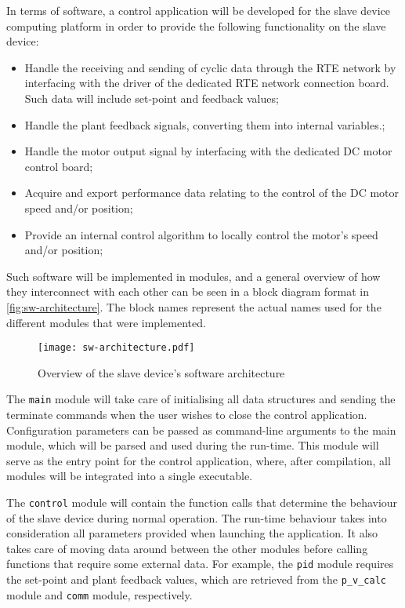 In terms of software, a control application will be developed for the slave device computing platform in order to provide the following functionality on the slave device:
\begin{itemize}
	\item Handle the receiving and sending of cyclic data through the RTE network by interfacing with the driver of the dedicated RTE network connection board. Such data will include set-point and feedback values;
	\item Handle the plant feedback signals, converting them into internal variables.;
	\item Handle the motor output signal by interfacing with the dedicated DC motor control board;
	\item Acquire and export performance data relating to the control of the DC motor speed and/or position;
	\item Provide an internal control algorithm to locally control the motor's speed and/or position;
\end{itemize}

Such software will be implemented in modules, and a general overview of how they interconnect with each other can be seen in a block diagram format in \autoref{fig:sw-architecture}.
The block names represent the actual names used for the different modules that were implemented.

\begin{figure}
	\centering
	\texttt{[image: sw-architecture.pdf]}
	\caption{Overview of the slave device's software architecture}
	\label{fig:sw-architecture}
\end{figure}

The \verb|main| module will take care of initialising all data structures and sending the terminate commands when the user wishes to close the control application.
Configuration parameters can be passed as command-line arguments to the main module, which will be parsed and used during the run-time.
This module will serve as the entry point for the control application, where, after compilation, all modules will be integrated into a single executable.

The \verb|control| module will contain the function calls that determine the behaviour of the slave device during normal operation.
The run-time behaviour takes into consideration all parameters provided when launching the application.
It also takes care of moving data around between the other modules before calling functions that require some external data.
For example, the \verb|pid| module requires the set-point and plant feedback values, which are retrieved from the \verb|p_v_calc| module and \verb|comm| module, respectively.

